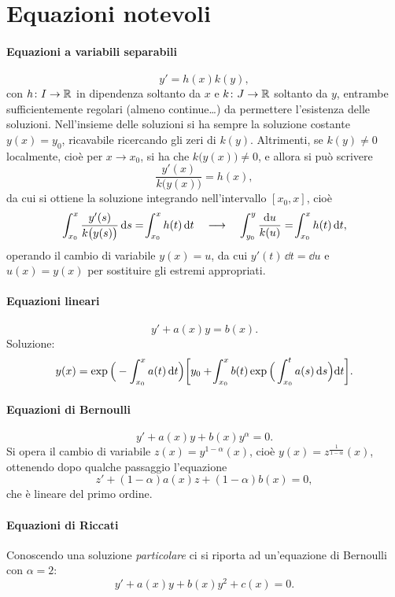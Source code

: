 \section{Equazioni notevoli}
\paragraph{Equazioni a variabili separabili}
\begin{equation}
y'=h(x)k(y),
\end{equation}
con $h\colon I\to\mathbb{R}$ in dipendenza soltanto da $x$ e $k\colon J\to\mathbb{R}$ soltanto da $y$, entrambe sufficientemente regolari (almeno continue\dots) da permettere l'esistenza delle soluzioni.
Nell'insieme delle soluzioni si ha sempre la soluzione costante $y(x)=y_0$, ricavabile ricercando gli zeri di $k(y)$. Altrimenti, se $k(y)\neq 0$ localmente, cioè per $x\to x_0$, si ha che $k\big(y(x)\big)\neq 0$, e allora si può scrivere
\[
\frac{y'(x)}{k\big(y(x)\big)}=h(x),
\]
da cui si ottiene la soluzione integrando nell'intervallo $[x_0,x]$, cioè
\[
\int_{x_0}^x\frac{y'(s)}{k\big(y(s)\big)}\,\textup{d} s=\!\int_{x_0}^xh(t)\,\textup{d} t\quad\longrightarrow\quad
\int_{y_0}^y\frac{\textup{d} u}{k(u)}=\!\int_{x_0}^xh(t)\,\textup{d} t,
\]
operando il cambio di variabile $y(x)=u$, da cui $y'(t)\,\dd t=\dd u$ e $u(x)=y(x)$ per sostituire gli estremi appropriati.
\paragraph{Equazioni lineari}
\begin{equation}
y'+a(x)y=b(x).
\end{equation}
Soluzione:
\begin{equation}
y(x)=\exp\Big(-\int_{x_0}^xa(t)\,\textup{d} t\Big)\bigg[y_0+\!\int_{x_0}^xb(t)\exp\Big(\int_{x_0}^ta(s)\,\textup{d} s\Big)\textup{d} t\bigg].
\end{equation}
\paragraph{Equazioni di Bernoulli}
\begin{equation}
y'+a(x)y+b(x)y^\alpha=0.
\end{equation}
Si opera il cambio di variabile $z(x)=y^{1-\alpha}(x)$, cioè $y(x)=z^{\frac1{1-\alpha}}(x)$, ottenendo dopo qualche passaggio l'equazione
\begin{equation}
z'+(1-\alpha)a(x)z+(1-\alpha)b(x)=0,
\end{equation}
che è lineare del primo ordine.
\paragraph{Equazioni di Riccati}
Conoscendo una soluzione \emph{particolare} ci si riporta ad un'equazione di Bernoulli con $\alpha=2$:
\begin{equation}
y'+a(x)y+b(x)y^2+c(x)=0.
\end{equation}
